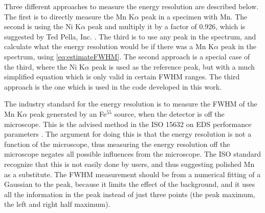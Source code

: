 

Three different approaches to measure the energy resolution are described below.
The first is to directly measure the Mn K$\alpha$ peak in a specimen with Mn.
The second is using the Ni K$\alpha$ peak and multiply it by a factor of 0.926, which is suggested by Ted Pella, Inc. \cite{ted_pella_nio_tem_2019}.
The third is to use any peak in the spectrum, and calculate what the energy resolution would be if there was a Mn K$\alpha$ peak in the spectrum, using \cref{eq:estimateFWHM}.
The second approach is a special case of the third, where the Ni K$\alpha$ peak is used as the reference peak, but with a much simplified equation which is only valid in certain FWHM ranges.
The third approach is the one which is used in the code developed in this work.


The industry standard for the energy resolution is to measure the FWHM of the Mn K$\alpha$ peak generated by an Fe$^{55}$ source, when the detector is off the microscope.
This is the advised method in the ISO 15632 on EDS performance parameters \cite{iso_qc_15632}.
The argument for doing this is that the energy resolution is not a function of the microscope, thus measuring the energy resolution off the microscope negates all possible influences from the microscope.
The ISO standard recognize that this is not easily done by users, and thus suggesting polished Mn as a substitute.
The FWHM measurement should be from a numerical fitting of a Gaussian to the peak, because it limits the effect of the background, and it uses all the information in the peak instead of just three points (the peak maximum, the left and right half maximum).


